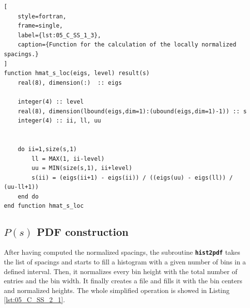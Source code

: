 \documentclass[pra, onecolumn, notitlepage, floats, 11pt]{revtex4-1}
\newcommand{\codebold}[2][cobalt]{\texttt{\bfseries {\color{#1}#2}}}
\begin{document}
\begin{lstlisting}[
    style=fortran,
    frame=single,
    label={lst:05_C_SS_1_3},
    caption={Function for the calculation of the locally normalized spacings.}
]
function hmat_s_loc(eigs, level) result(s)
    real(8), dimension(:)  :: eigs

    integer(4) :: level
    real(8), dimension(lbound(eigs,dim=1):(ubound(eigs,dim=1)-1)) :: s
    integer(4) :: ii, ll, uu


    do ii=1,size(s,1)
        ll = MAX(1, ii-level)
        uu = MIN(size(s,1), ii+level)
        s(ii) = (eigs(ii+1) - eigs(ii)) / ((eigs(uu) - eigs(ll)) / (uu-ll+1))
    end do
end function hmat_s_loc
\end{lstlisting}



\subsection{\( P(s) \) PDF construction}
After having computed the normalized spacings, the subroutine \codebold[black]{hist2pdf} takes the list of spacings and starts to fill a histogram with a given number of bins in a defined interval. Then, it normalizes every bin height with the total number of entries and the bin width. It finally creates a file and fills it with the bin centers and normalized heights. The whole simplified operation is showed in Listing \ref{lst:05_C_SS_2_1}.
\end{document}
